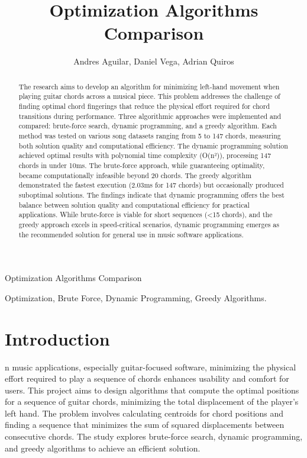 \documentclass[lettersize,journal]{IEEEtran}
\begin{document}
\title{Optimization Algorithms Comparison}
\author{Andres Aguilar, Daniel Vega, Adrian Quiros}

%
{Optimization Algorithms Comparison}

\maketitle

\begin{abstract}
The research aims to develop an algorithm for minimizing left-hand movement when playing guitar chords across a musical piece. This problem addresses the challenge of finding optimal chord fingerings that reduce the physical effort required for chord transitions during performance. Three algorithmic approaches were implemented and compared: brute-force search, dynamic programming, and a greedy algorithm. Each method was tested on various song datasets ranging from 5 to 147 chords, measuring both solution quality and computational efficiency. The dynamic programming solution achieved optimal results with polynomial time complexity (O(n²)), processing 147 chords in under 10ms. The brute-force approach, while guaranteeing optimality, became computationally infeasible beyond 20 chords. The greedy algorithm demonstrated the fastest execution (2.03ms for 147 chords) but occasionally produced suboptimal solutions. The findings indicate that dynamic programming offers the best balance between solution quality and computational efficiency for practical applications. While brute-force is viable for short sequences (<15 chords), and the greedy approach excels in speed-critical scenarios, dynamic programming emerges as the recommended solution for general use in music software applications.
\end{abstract}

\begin{IEEEkeywords}
Optimization, Brute Force, Dynamic Programming, Greedy Algorithms.
\end{IEEEkeywords}

\section{Introduction}
n music applications, especially guitar-focused software, minimizing the physical effort required to play a sequence of chords enhances usability and comfort for users. This project aims to design algorithms that compute the optimal positions for a sequence of guitar chords, minimizing the total displacement of the player's left hand. The problem involves calculating centroids for chord positions and finding a sequence that minimizes the sum of squared displacements between consecutive chords. The study explores brute-force search, dynamic programming, and greedy algorithms to achieve an efficient solution.
\end{document}
